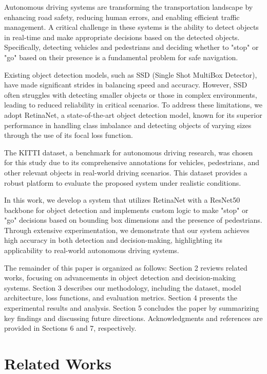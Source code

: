 \documentclass[10pt,twocolumn,letterpaper]{article}
\begin{document}
Autonomous driving systems are transforming the transportation landscape by enhancing road safety, reducing human errors, and enabling efficient traffic management. A critical challenge in these systems is the ability to detect objects in real-time and make appropriate decisions based on the detected objects. Specifically, detecting vehicles and pedestrians and deciding whether to "stop" or "go" based on their presence is a fundamental problem for safe navigation.

Existing object detection models, such as SSD (Single Shot MultiBox Detector), have made significant strides in balancing speed and accuracy. However, SSD often struggles with detecting smaller objects or those in complex environments, leading to reduced reliability in critical scenarios. To address these limitations, we adopt RetinaNet, a state-of-the-art object detection model, known for its superior performance in handling class imbalance and detecting objects of varying sizes through the use of its focal loss function.

The KITTI dataset, a benchmark for autonomous driving research, was chosen for this study due to its comprehensive annotations for vehicles, pedestrians, and other relevant objects in real-world driving scenarios. This dataset provides a robust platform to evaluate the proposed system under realistic conditions.

In this work, we develop a system that utilizes RetinaNet with a ResNet50 backbone for object detection and implements custom logic to make "stop" or "go" decisions based on bounding box dimensions and the presence of pedestrians. Through extensive experimentation, we demonstrate that our system achieves high accuracy in both detection and decision-making, highlighting its applicability to real-world autonomous driving systems.

The remainder of this paper is organized as follows: Section 2 reviews related works, focusing on advancements in object detection and decision-making systems. Section 3 describes our methodology, including the dataset, model architecture, loss functions, and evaluation metrics. Section 4 presents the experimental results and analysis. Section 5 concludes the paper by summarizing key findings and discussing future directions. Acknowledgments and references are provided in Sections 6 and 7, respectively.

\section{Related Works}
\end{document}
